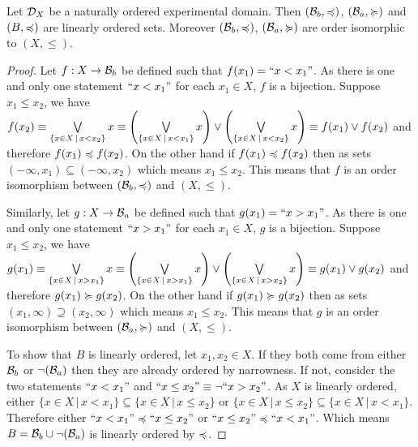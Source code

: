 \begin{mathSection}
	\begin{prop}\label{pm-pq-basisOrdering}
		Let $\mathcal{D}_X$ be a naturally ordered experimental domain. Then $(\mathcal{B}_b, \preccurlyeq)$, $(\mathcal{B}_a, \succcurlyeq)$ and $(B, \preccurlyeq)$ are linearly ordered sets. Moreover $(\mathcal{B}_b, \preccurlyeq)$, $(\mathcal{B}_a, \succcurlyeq)$ are order isomorphic to $(X, \leq)$.
	\end{prop}
	\begin{proof}
		Let $f : X \to \mathcal{B}_b$ be defined such that $f(x_1) = ``x < x_1"$. As there is one and only one statement $``x < x_1"$ for each $x_1 \in X$, $f$ is a bijection. Suppose $x_1 \leq x_2$, we have $f(x_2) \equiv \bigvee\limits_{\{x \in X \, | \, x < x_2\}} x \equiv \left( \bigvee\limits_{\{x \in X \, | \, x < x_1\}} x\right) \vee \left( \bigvee\limits_{\{x \in X \, | \, x < x_2\}} x \right)\equiv f(x_1) \vee f(x_2)$ and therefore $f(x_1) \preccurlyeq f(x_2)$. On the other hand if $f(x_1) \preccurlyeq f(x_2)$ then as sets $(-\infty, x_1) \subseteq (-\infty, x_2)$ which means $x_1 \leq x_2$. This means that $f$ is an order isomorphism between $(\mathcal{B}_b, \preccurlyeq)$ and $(X, \leq)$.
		
		Similarly, let $g : X \to \mathcal{B}_a$ be defined such that $g(x_1) = ``x > x_1"$. As there is one and only one statement $``x > x_1"$ for each $x_1 \in X$, $g$ is a bijection. Suppose $x_1 \leq x_2$, we have $g(x_1) \equiv \bigvee\limits_{\{x \in X \, | \, x > x_1\}} x \equiv \left( \bigvee\limits_{\{x \in X \, | \, x > x_1\}} x \right) \vee \left(\bigvee\limits_{\{x \in X \, | \, x > x_2\}} x \right) \equiv g(x_1) \vee g(x_2)$ and therefore $g(x_1) \succcurlyeq g(x_2)$. On the other hand if $g(x_1) \succcurlyeq g(x_2)$ then as sets $(x_1, \infty) \supseteq (x_2, \infty)$ which means $x_1 \leq x_2$. This means that $g$ is an order isomorphism between $(\mathcal{B}_a, \succcurlyeq)$ and $(X, \leq)$.
		
		To show that $B$ is linearly ordered, let $x_1, x_2 \in X$. If they both come from either $\mathcal{B}_b$ or $\neg(\mathcal{B}_a)$ then they are already ordered by narrowness. If not, consider the two statements $``x < x_1"$ and $``x \leq x_2"\equiv \neg ``x > x_2"$. As $X$ is linearly ordered, either $\{x \in X \, | \, x < x_1\} \subseteq \{x \in X \, | \, x \leq x_2\}$ or $\{x \in X \, | \, x \leq x_2\} \subseteq \{x \in X \, | \, x < x_1\}$. Therefore either $``x < x_1" \preccurlyeq ``x \leq x_2"$ or $``x \leq x_2" \preccurlyeq ``x < x_1"$. Which means $B = \mathcal{B}_b \cup \neg(\mathcal{B}_a)$ is linearly ordered by $\preccurlyeq$.
	\end{proof}
	

\end{mathSection}
